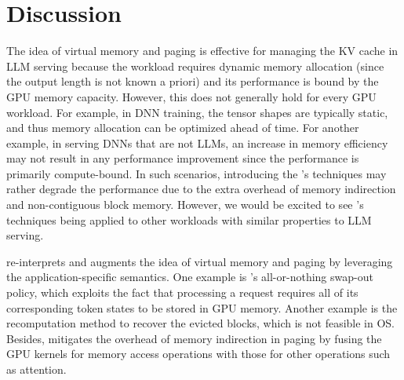 \section{Discussion}

The idea of virtual memory and paging is effective for managing the KV cache in LLM serving because the workload requires dynamic memory allocation (since the output length is not known a priori) and its performance is bound by the GPU memory capacity.
However, this does not generally hold for every GPU workload.
For example, in DNN training, the tensor shapes are typically static, and thus memory allocation can be optimized ahead of time.
For another example, in serving DNNs that are not LLMs, an increase in memory efficiency may not result in any performance improvement since the performance is primarily compute-bound.
In such scenarios, introducing the \sys's techniques may rather degrade the performance due to the extra overhead of memory indirection and non-contiguous block memory.
However, we would be excited to see \sys's techniques being applied to other workloads with similar properties to LLM serving.

\sys re-interprets and augments the idea of virtual memory and paging by leveraging the application-specific semantics.
One example is \sys's all-or-nothing swap-out policy, which exploits the fact that processing a request requires all of its corresponding token states to be stored in GPU memory.
Another example is the recomputation method to recover the evicted blocks, which is not feasible in OS.
Besides, \sys mitigates the overhead of memory indirection in paging by fusing the GPU kernels for memory access operations with those for other operations such as attention.
